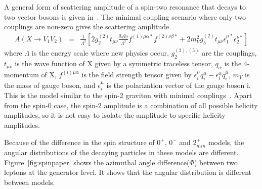 A general form of scattering amplitude of a spin-two resonance that decays to two vector 
bosons is given in~\cite{Bolognesi:2012mm}. The minimal coupling scenario 
where only two couplings are non-zero gives the scattering amplitude 
\begin{eqnarray} 
A(X \rightarrow V_1V_2)
&=& 
\frac{1}{\Lambda^2}  
\left[ 
2 g_2^{(2)} t_{\mu\nu} \frac{q_\alpha q_\beta}{\Lambda^2} 
f^{(1)\mu\alpha*} f^{(2)\nu\beta*} 
+ 
2 m_V^2 g_5^{(2)} t_{\mu\nu} 
\epsilon^{\mu*}_1 \epsilon^{\nu*}_2 
\right] 
\end{eqnarray} 
where $\Lambda$ is the energy scale where new physics occur, 
$g_2^{(2),(5)}$ are the couplings, 
$t_{\mu\nu}$ is the wave function of X given by a symmetric traceless tensor, 
$q_{\alpha}$ is the 4-momentum of X, 
$f^{(i)\mu\alpha}$ is the field strength tensor given by 
    $\epsilon_i^\mu q_i^\alpha - \epsilon_i^\alpha q_i^\mu$, 
$m_V$ is the mass of gauge boson, and 
$\epsilon_i^{\mu}$ is the polarization vector of the gauge boson i.
This is the model similar to the spin-2 graviton with minimal couplings~\cite{Bolognesi:2012mm}. 
Apart from the spin-0 case, the spin-2 amplitude is a combination of 
all possible helicity amplitudes, so it is not easy to isolate the 
amplitude to specific helicity amplitudes. 

Because of the difference in the spin structure of $0^+$, $0^-$ and $2_{min}^+$ models, 
the angular distributions of the decaying particles in these models are different.  
Figure~\ref{fig:spinpaper} shows the azimuthal angle difference($\Phi$) between 
two leptons at the generator level. It shows that the angular distribution is 
different between models. 



